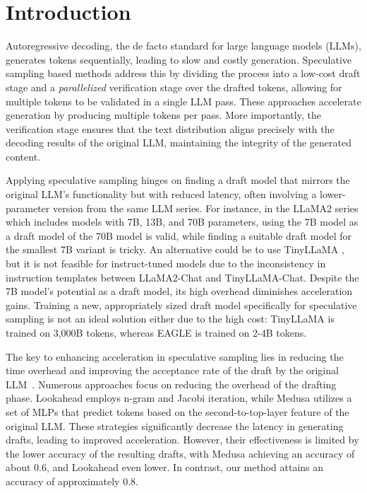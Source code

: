 \documentclass{article}
\theoremstyle{plain}
\theoremstyle{definition}
\theoremstyle{remark}
\begin{document}
\section{Introduction}



Autoregressive decoding, the de facto standard for large language models (LLMs), generates tokens sequentially, leading to slow and costly generation. 
Speculative sampling \cite{leviathan2023fast,chen2023accelerating} based methods address this by dividing the process into a low-cost draft stage and a \emph{parallelized} verification stage over the drafted tokens, allowing for multiple tokens to be validated in a single LLM pass. These approaches accelerate generation by producing multiple tokens per pass. More importantly, the verification stage ensures that the text distribution aligns precisely with the decoding results of the original LLM, maintaining the integrity of the generated content.

Applying speculative sampling hinges on finding a draft model that mirrors the original LLM's functionality but with reduced latency, often involving a lower-parameter version from the same LLM series. For instance, in the LLaMA2 \cite{touvron2023llama} series which includes models with 7B, 13B, and 70B parameters, using the 7B model as a draft model of the 70B model is valid, while finding a suitable draft model for the smallest 7B variant is tricky. An alternative could be to use TinyLLaMA \cite{zhang2024tinyllama}, but it is not feasible for instruct-tuned models due to the inconsistency in instruction templates between LLaMA2-Chat and TinyLLaMA-Chat. Despite the 7B model's potential as a draft model, its high overhead diminishes acceleration gains.
Training a new, appropriately sized draft model specifically for speculative sampling is not an ideal solution either due to the high cost: 
TinyLLaMA is trained on 3,000B tokens, whereas EAGLE is trained on 2-4B tokens.



The key to enhancing acceleration in speculative sampling lies in reducing the time overhead and improving the acceptance rate of the draft by the original LLM~\cite{chen2023cascade,xia2023speculative,santilli-etal-2023-accelerating}. Numerous approaches focus on reducing the overhead of the drafting phase. Lookahead \cite{fu2023lookahead} employs n-gram and Jacobi iteration, while Medusa \cite{medusa} utilizes a set of MLPs that predict tokens based on the second-to-top-layer feature of the original LLM. These strategies significantly decrease the latency in generating drafts, leading to improved acceleration. However, their effectiveness is limited by the lower accuracy of the resulting drafts, with Medusa achieving an accuracy of about 0.6, and Lookahead even lower. In contrast, our method attains an accuracy of approximately 0.8.
\end{document}
